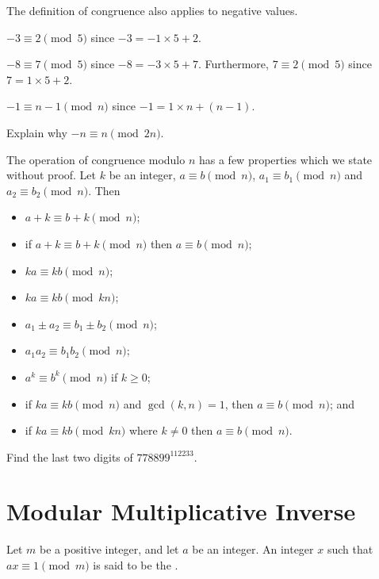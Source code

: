 The definition of congruence also applies to negative values.
\begin{example}
    $-3 \equiv 2 \pmod5$ since $-3 = -1\times5 + 2$.
\end{example}

\begin{example}
    $-8 \equiv 7 \pmod5$ since $-8 = -3\times5 + 7$. Furthermore, $7 \equiv 2 \pmod5$ since $7 = 1\times5 + 2$.
\end{example}

\begin{example}
    $-1 \equiv n-1 \pmod{n}$ since $-1 = 1\times n + (n-1)$.
\end{example}

\begin{exercise}
    Explain why $-n \equiv n \pmod{2n}$.
\end{exercise}

The operation of congruence modulo $n$ has a few properties which we state without proof. Let $k$ be an integer, $a \equiv b \pmod n$, $a_1 \equiv b_1 \pmod n$ and $a_2 \equiv b_2 \pmod n$. Then
\begin{itemize}
    \item $a + k \equiv b + k \pmod n$;
    \item if $a+k \equiv b+k \pmod n$ then $a \equiv b \pmod n$;
    \item $ka \equiv kb \pmod n$;
    \item $ka \equiv kb \pmod {kn}$;
    \item $a_1 \pm a_2 \equiv b_1 \pm b_2 \pmod n$;
    \item $a_1a_2 \equiv b_1b_2 \pmod n$;
    \item $a^k \equiv b^k \pmod n$ if $k \geq 0$;
    \item if $ka \equiv kb \pmod n$ and $\gcd(k, n) = 1$, then $a \equiv b \pmod n$; and
    \item if $ka \equiv kb \pmod{kn}$ where $k \neq 0$ then $a \equiv b \pmod n$.
\end{itemize}

\begin{exercise}
    Find the last two digits of $778899^{112233}$.
\end{exercise}



\section{Modular Multiplicative Inverse}
\begin{definition}
    Let $m$ be a positive integer, and let $a$ be an integer. An integer $x$ such that $ax \equiv 1 \pmod m$ is said to be the .
\end{definition}

